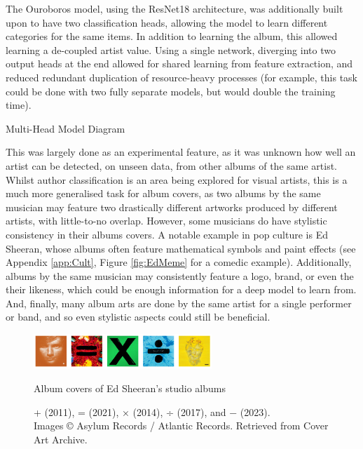                 The Ouroboros model, using the ResNet18 architecture, was additionally built upon to have two classification heads, allowing the model to learn different categories for the same items. In addition to learning the album, this allowed learning a de-coupled artist value. Using a single network, diverging into two output heads at the end allowed for shared learning from feature extraction, and reduced redundant duplication of resource-heavy processes (for example, this task could be done with two fully separate models, but would double the training time).
    
                \begin{temp}
                    Multi-Head Model Diagram
                \end{temp}
    
                This was largely done as an experimental feature, as it was unknown how well an artist can be detected, on unseen data, from other albums of the same artist. Whilst author classification is an area being explored for visual artists, this is a much more generalised task for album covers, as two albums by the same musician may feature two drastically different artworks produced by different artists, with little-to-no overlap. However, some musicians do have stylistic consistency in their albums covers. A notable example in pop culture is Ed Sheeran, whose albums often feature mathematical symbols and paint effects (see Appendix \ref{app:Cult}, Figure \ref{fig:EdMeme} for a comedic example). Additionally, albums by the same musician may consistently feature a logo, brand, or even the their likeness, which could be enough information for a deep model to learn from. And, finally, many album arts are done by the same artist for a single performer or band, and so even stylistic aspects could still be beneficial.
    
                \begin{figure}[h]
                    \centering
                    \includegraphics[width=0.6\textwidth]{images/EdAlbums.png}
                    \caption{Album covers of Ed Sheeran’s studio albums}
                    \label{fig:EdAlbums}
                    \caption*{+ (2011), = (2021), × (2014), ÷ (2017), and − (2023). \\ Images © Asylum Records / Atlantic Records. Retrieved from Cover Art Archive.}
                \end{figure}
    
